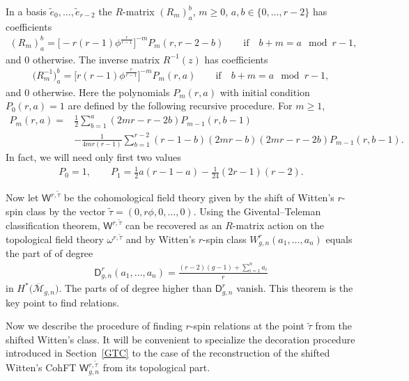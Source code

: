 \documentclass[pdftex]{sigma}
\def\D{\mathsf{D}}
\numberwithin{equation}{section}
\begin{document}
In a basis $\widetilde{e}_0,\dots,\widetilde{e}_{r-2}$ the $R$-matrix $(R_m)^b_a$, $m\geq 0$, $a,b \in\{0,\dots,r-2\}$ has coefficients
\begin{align*}
(R_m)^b_a = \bigl[-r(r-1)\phi^{\frac{r}{r-1}}\bigr]^{-m} P_m(r,r-2-b) \qquad
 \mbox{if} \quad b+m = a \mod{r-1},
\end{align*}
and 0 otherwise.
The inverse matrix $R^{-1}(z)$ has coefficients
\begin{align*}
\big(R_m^{-1}\big)^b_a = \big[r(r-1)\phi^{\frac{r}{r-1}}\big]^{-m} P_m(r,a) \qquad
 \mbox{if} \quad b+m = a \mod{r-1},
 \end{align*}
 and 0 otherwise.
Here the polynomials $P_m(r,a)$ with initial condition $P_0(r,a) = 1$ are defined by the following recursive procedure. For $m \geq 1$,
\begin{align*}
P_m(r,a)={}&
\frac12\sum_{b=1}^a (2mr-r-2b) P_{m-1}(r,b-1)\nonumber\\
& - \frac1{4mr(r-1)}
\sum_{b=1}^{r-2} (r-1-b)(2mr-b)(2mr-r-2b) P_{m-1}(r,b-1) .\label{Eq:DefP}
\end{align*}
In fact, we will need only first two values
\begin{align*}
P_0 = 1, \qquad
P_1 = \frac12 a(r-1-a) - \frac1{24}(2r-1)(r-2).
\end{align*}

Now let $\mathsf{W}^{r,\widetilde{\tau}}$ be the cohomological field theory given by the shift of Witten's
$r$-spin class by the vector $\widetilde{\tau} = (0, r \phi, 0,\ldots, 0)$. Using the Givental--Teleman classification theorem, $\mathsf{W}^{r,\widetilde{\tau}}$ can be recovered as an $R$-matrix action on the topological field theory $\omega ^{r,\widetilde{\tau}}$ and by \cite[Theorem~9]{PPZ16} Witten's $r$-spin class $W^r_{g,n}(a_1,\dots,a_n)$ equals the part of  of degree
\begin{align*}
\D^r_{g,n}(a_1, \dots, a_n) = \frac{(r-2)(g-1) + \sum_{i=1}^n a_i}r
\end{align*}
in $H^*\big(\overline{\mathcal{M}}_{g,n}\big)$.
The parts of  of degree
higher than $\D^r_{g,n}$ vanish. This theorem is the key point to find relations.


Now we describe the procedure of finding $r$-spin relations at the point $\widetilde{\tau}$ from the shifted Witten's class. It will be convenient to specialize the decoration procedure introduced in Section~\ref{GTC} to the case of the reconstruction of the shifted Witten's CohFT $\mathsf{W}^{r, \widetilde{\tau}}_{g,n}$ from its topological part.
\end{document}
